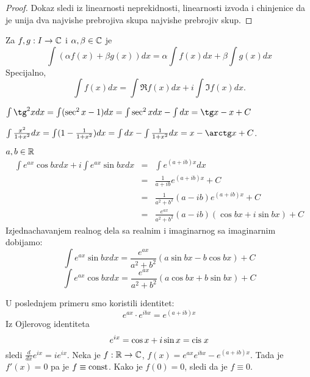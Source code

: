 \documentclass[../main.tex]{subfiles}
\begin{document}
\begin{proof}
Dokaz sledi iz linearnosti neprekidnosti, linearnosti izvoda i chinjenice da je unija dva najvishe prebrojiva skupa najvishe prebrojiv skup.
\end{proof}
\begin{posl}
Za $f,g:I \to \mathbb{C}$ i $\alpha, \beta \in \mathbb{C}$ je
$$\int (\alpha f(x) + \beta g(x)) dx = \alpha \int f(x) dx + \beta \int g(x) dx$$
Specijalno, $$\int f(x) dx = \int \Re f(x) dx + i\int \Im f(x)dx.$$
\end{posl}
\begin{pr}
$\int \tg^2 x dx = \int (\sec^2 x - 1) dx = \int \sec^2 x dx - \int dx = \tg x - x + C$
\end{pr}
\begin{pr}
$\int \frac{x^2}{1+x^2}dx= \int (1-\frac{1}{1+x^2})dx=\int dx - \int \frac{1}{1+x^2}dx= x-\arctg x +C$.
\end{pr}
\begin{pr}
$a,b \in \mathbb{R}$ 
\begin{eqnarray*}
 \int e^{ax} \cos{bx} dx+ i \int e^{ax} \sin{bx} dx&=& \int e^{(a+ib)x} dx\\
 &=& \frac{1}{a+ib} e^{(a+ib)x}+C \\
 &=& \frac{1}{a^2+b^2}(a-ib) e^{(a+ib)x}+C \\
 &=& \frac{e^{ax}}{a^2+b^2}(a-ib)(\cos bx + i \sin bx)+C
\end{eqnarray*}
Izjednachavanjem realnog dela sa realnim i imaginarnog sa imaginarnim dobijamo:
$$\int e^{ax} \sin bx dx=\frac{e^{ax}}{a^2+b^2}(a \sin bx - b \cos bx)+C$$
$$\int e^{ax} \cos bx dx=\frac{e^{ax}}{a^2+b^2}(a \cos bx+b \sin bx) +C$$
\end{pr}
\nap U poslednjem primeru smo koristili identitet:
$$e^{ax}\cdot e^{ibx}=e^{(a+ib)x}$$ 
Iz Ojlerovog identiteta
$$e^{ix}=\cos x+i \sin x=\text{\latin {cis}}\hspace{0.1cm} x$$
sledi $\frac{d}{dx} e^{ix}=i e^{ix}$. Neka je $f:\mathbb{R} \to \mathbb{C}$,
$f(x)=e^{ax}e^{ibx}-e^{(a+ib)x}$. Tada je $f'(x)=0$ pa je $f\equiv \operatorname{const}$. Kako je $f(0)=0$, sledi da je $f\equiv 0$.
\end{document}
